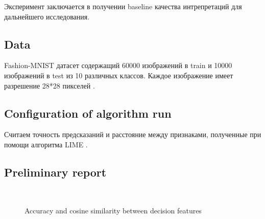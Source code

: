 \documentclass[12pt]{article}
\begin{document}
Эксперимент заключается в получении baseline качества интрепретаций для дальнейшего исследования.

\subsection{Data}

  Fashion-MNIST датасет содержащий 60000 изображений в train и 10000 изображений в test из 10 различных классов. Каждое изображение имеет разрешение 28*28 пикселей  \citep{fashionmnist}.

\subsection{Configuration of algorithm run}

Считаем точность предсказаний и расстояние между признаками, полученные при помощи алгоритма LIME \cite{ribeiro2016why}.

\subsection{Preliminary report}


\begin{figure}[!t]
  \\
 \caption{Accuracy and cosine similarity between decision features}
  \label{fig:1}
\end{figure}

\newpage



\end{document}
